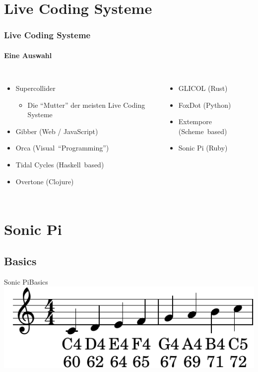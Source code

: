 \documentclass{beamer}
\begin{document}
\section{Live Coding Systeme}
\begin{frame}
  \frametitle{Live Coding Systeme}
  \framesubtitle{Eine Auswahl}
  \begin{columns}
    \begin{itemize}
      \item Supercollider
        \begin{itemize}
          \item Die ``Mutter'' der meisten Live Coding Systeme
        \end{itemize}
      \item Gibber (Web / JavaScript)
      \item Orca (Visual~``Programming'')
      \item Tidal Cycles (Haskell~based)
      \item Overtone (Clojure)
    \end{itemize}

    \begin{itemize}
      \item GLICOL (Rust)
      \item FoxDot (Python)
      \item Extempore (Scheme~based)
      \item Sonic Pi (Ruby)
    \end{itemize}
  \end{columns}
\end{frame}

\section{Sonic Pi}
\subsection{Basics}
\begin{frame}{Sonic Pi}{Basics}
  \includegraphics{images/scale.pdf}
\end{frame}
\addtocounter{framenumber}{-1}
\end{document}
